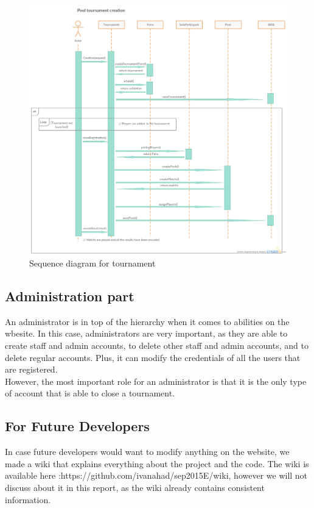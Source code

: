 \documentclass[a4paper, 12pt]{article}
\begin{document}
\begin{figure}[h]
   \caption{\label{tournseq} Sequence diagram for tournament}
  \includegraphics[scale=0.4]{Tournament.png}
\end{figure}
\FloatBarrier
\newpage


\subsection*{Administration part}

An administrator is in top of the hierarchy when it comes to abilities on the wbesite. In this case, administrators are very important, as they are able to create staff and admin accounts, to delete other staff and admin accounts, and to delete regular accounts. Plus, it can modify the credentials of all the users that are registered.\\

However, the most important role for an administrator is that it is the only type of account that is able to close a tournament.

\subsection*{For Future Developers}

In case future developers would want to modify anything on the website, we made a wiki that explains everything about the project and the code. The wiki is available here :https://github.com/ivanahad/sep2015E/wiki, however we will not discuss about it in this report, as the wiki already contains consistent information.
\end{document}
